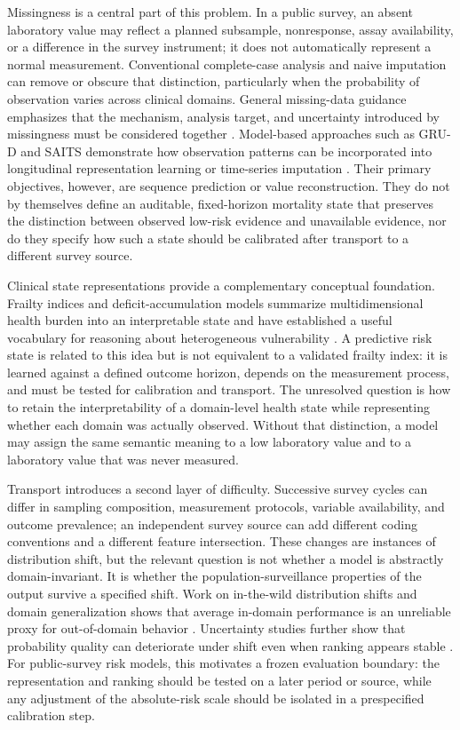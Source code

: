 \documentclass[12pt]{article}
\begin{document}
Missingness is a central part of this problem. In a public survey, an absent laboratory value may reflect a planned subsample, nonresponse, assay availability, or a difference in the survey instrument; it does not automatically represent a normal measurement. Conventional complete-case analysis and naive imputation can remove or obscure that distinction, particularly when the probability of observation varies across clinical domains. General missing-data guidance emphasizes that the mechanism, analysis target, and uncertainty introduced by missingness must be considered together \cite{sterne_2009_imputation,little_2012_missing}. Model-based approaches such as GRU-D and SAITS demonstrate how observation patterns can be incorporated into longitudinal representation learning or time-series imputation \cite{che_2018_grud,du_2023_saits}. Their primary objectives, however, are sequence prediction or value reconstruction. They do not by themselves define an auditable, fixed-horizon mortality state that preserves the distinction between observed low-risk evidence and unavailable evidence, nor do they specify how such a state should be calibrated after transport to a different survey source.

Clinical state representations provide a complementary conceptual foundation. Frailty indices and deficit-accumulation models summarize multidimensional health burden into an interpretable state and have established a useful vocabulary for reasoning about heterogeneous vulnerability \cite{searle_2008_frailty,rockwood_2007_frailty}. A predictive risk state is related to this idea but is not equivalent to a validated frailty index: it is learned against a defined outcome horizon, depends on the measurement process, and must be tested for calibration and transport. The unresolved question is how to retain the interpretability of a domain-level health state while representing whether each domain was actually observed. Without that distinction, a model may assign the same semantic meaning to a low laboratory value and to a laboratory value that was never measured.

Transport introduces a second layer of difficulty. Successive survey cycles can differ in sampling composition, measurement protocols, variable availability, and outcome prevalence; an independent survey source can add different coding conventions and a different feature intersection. These changes are instances of distribution shift, but the relevant question is not whether a model is abstractly domain-invariant. It is whether the population-surveillance properties of the output survive a specified shift. Work on in-the-wild distribution shifts and domain generalization shows that average in-domain performance is an unreliable proxy for out-of-domain behavior \cite{koh_2021_wilds,gulrajani_2021_domain_generalization}. Uncertainty studies further show that probability quality can deteriorate under shift even when ranking appears stable \cite{ovadia_2019_uncertainty}. For public-survey risk models, this motivates a frozen evaluation boundary: the representation and ranking should be tested on a later period or source, while any adjustment of the absolute-risk scale should be isolated in a prespecified calibration step.
\end{document}
